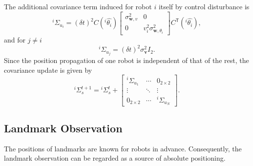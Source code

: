 \documentclass[xcolor=x11names]{article}
\DeclareMathOperator\T{\mathsf{T}}
\begin{document}
   The additional covariance term induced for robot $i$ itself by control disturbance is
   \begin{equation}
      ^i\Sigma_{u_i} = (\delta t)^2 C(^i\hat{\theta_i})  
      \begin{bmatrix} 
         \sigma_{\mathbf{w},v}^2 & 0 \\ 0 & v_{i}^2  \sigma_{\mathbf{w},\theta_i}^2 
      \end{bmatrix}
      C^{\T}(^i\hat{\theta_i}),
   \end{equation}
   and for $j \neq i$
   \begin{equation}
      ^i\Sigma_{u_j} = (\delta t)^2 \sigma_{\mathbf{v}}^2 I_2 . 
   \end{equation}
   Since the position propagation of one robot is independent of that of the rest, the covariance update is given by
   \begin{equation}
      ^i\Sigma_{s}^{t+1} = {^i}\Sigma_{s}^{t} +
      \begin{bmatrix} 
         ^i\Sigma_{u_1} & \cdots & 0_{2\times2} \\
         \vdots  & \ddots & \vdots  \\
         0_{2\times2} & \cdots & ^i\Sigma_{u_N}       
      \end{bmatrix}.
   \end{equation}




\subsection{Landmark Observation}
   The positions of landmarks are known for robots in advance. Consequently, the landmark observation can be regarded as a source of absolute positioning.
   
\end{document}
